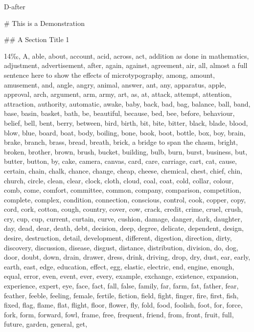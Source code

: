 \endgroup{}D-after
\begin{multicols}{2}\# This is a Demonstration \mktsShowpar\par
\#\# A Section Title 1 \mktsShowpar\par
14{\mktsFontfileOptima‰}, A, able, about, account, acid, across, act, addition as done in mathematics, adjustment,
advertisement, after, again, against, agreement, air, all, almost a full sentence here
to show the effects of microtypography, among,
amount, amusement, and, angle, angry, animal, answer, ant, any, apparatus,
apple, approval, arch, argument, arm, army, art, as, at, attack, attempt,
attention, attraction, authority, automatic, awake, baby, back, bad, bag,
balance, ball, band, base, basin, basket, bath, be, beautiful, because, bed,
bee, before, behaviour, belief, bell, bent, berry, between, bird, birth, bit,
bite, bitter, black, blade, blood, blow, blue, board, boat, body, boiling,
bone, book, boot, bottle, box, boy, brain, brake, branch, brass, bread,
breath, brick, a bridge to span the chasm, bright, broken, brother, brown, brush, bucket,
building, bulb, burn, burst, business, but, butter, button, by, cake, camera,
canvas, card, care, carriage, cart, cat, cause, certain, chain, chalk, chance,
change, cheap, cheese, chemical, chest, chief, chin, church, circle, clean,
clear, clock, cloth, cloud, coal, coat, cold, collar, colour, comb, come,
comfort, committee, common, company, comparison, competition, complete,
complex, condition, connection, conscious, control, cook, copper, copy, cord,
cork, cotton, cough, country, cover, cow, crack, credit, crime, cruel, crush,
cry, cup, cup, current, curtain, curve, cushion, damage, danger, dark,
daughter, day, dead, dear, death, debt, decision, deep, degree, delicate,
dependent, design, desire, destruction, detail, development, different,
digestion, direction, dirty, discovery, discussion, disease, disgust,
distance, distribution, division, do, dog, door, doubt, down, drain, drawer,
dress, drink, driving, drop, dry, dust, ear, early, earth, east, edge,
education, effect, egg, elastic, electric, end, engine, enough, equal, error,
even, event, ever, every, example, exchange, existence, expansion, experience,
expert, eye, face, fact, fall, false, family, far, farm, fat, father, fear,
feather, feeble, feeling, female, fertile, fiction, field, fight, finger,
fire, first, fish, fixed, flag, flame, flat, flight, floor, flower, fly, fold,
food, foolish, foot, for, force, fork, form, forward, fowl, frame, free,
frequent, friend, from, front, fruit, full, future, garden, general, get,

\end{multicols}
